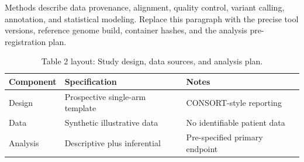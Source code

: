 
Methods describe data provenance, alignment, quality control, variant calling, annotation, and statistical modeling. Replace this paragraph with the precise tool versions, reference genome build, container hashes, and the analysis pre-registration plan.

\begin{table}[H]
\caption{Table 2 layout: Study design, data sources, and analysis plan.}
\label{tab:methods_design}
\centering
\begin{tabular}{>{\raggedright\arraybackslash}p{3.4cm} >{\raggedright\arraybackslash}p{4.6cm} >{\raggedright\arraybackslash}p{5.4cm}}
\toprule
\textbf{Component} & \textbf{Specification} & \textbf{Notes} \\
\midrule
  Design & Prospective single-arm template & CONSORT-style reporting \\
  Data & Synthetic illustrative data & No identifiable patient data \\
  Analysis & Descriptive plus inferential & Pre-specified primary endpoint \\
\bottomrule
\end{tabular}
\end{table}
